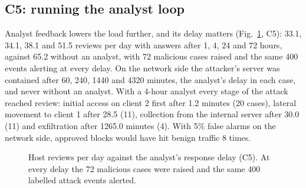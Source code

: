 \documentclass[conference]{IEEEtran}
\begin{document}
\subsection{C5: running the analyst loop}
Analyst feedback lowers the load further, and its delay matters (Fig.~\ref{fig:delay}, C5): 33.1, 34.1, 38.1 and
51.5 reviews per day with answers after 1, 4, 24 and 72 hours, against 65.2 without an analyst, with 72 malicious
cases raised and the same 400 events alerting at every delay. On the network side the attacker's server was
contained after 60, 240, 1440 and 4320 minutes, the analyst's delay in each case, and never without an analyst.
With a 4-hour analyst every stage of the attack reached review: initial access on client 2 first after 1.2
minutes (20 cases), lateral movement to client 1 after 28.5 (11), collection from the internal server after 30.0
(11) and exfiltration after 1265.0 minutes (4). With 5\% false alarms on the network side, approved blocks would
have hit benign traffic 8 times.

\begin{figure}[t]
\centering
{}
\caption{Host reviews per day against the analyst's response delay (C5). At every delay the 72 malicious cases
were raised and the same 400 labelled attack events alerted.}
\label{fig:delay}
\end{figure}
\end{document}
